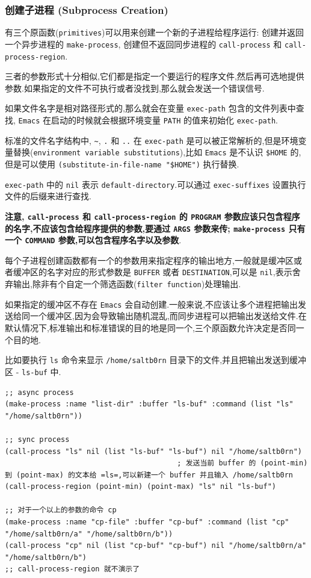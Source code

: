 \documentclass[11pt]{article}
\begin{document}
\subsubsection{创建子进程 (Subprocess Creation)}
\label{sec:org5fa4f65}

有三个原函数(\texttt{primitives})可以用来创建一个新的子进程给程序运行: 创建并返回一个异步进程的 \texttt{make-process}, 创建但不返回同步进程的 \texttt{call-process} 和 \texttt{call-process-region}.

三者的参数形式十分相似,它们都是指定一个要运行的程序文件,然后再可选地提供参数.如果指定的文件不可执行或者没找到,那么就会发送一个错误信号.

如果文件名字是相对路径形式的,那么就会在变量 \texttt{exec-path} 包含的文件列表中查找, \texttt{Emacs} 在启动的时候就会根据环境变量 \texttt{PATH} 的值来初始化 \texttt{exec-path}.

标准的文件名字结构中, \texttt{\textasciitilde{}}, \texttt{.} 和 \texttt{..} 在 \texttt{exec-path} 是可以被正常解析的,但是环境变量替换(\texttt{environment variable substitutions}),比如 \texttt{Emacs} 是不认识 \texttt{\$HOME} 的,但是可以使用 \texttt{(substitute-in-file-name "\$HOME")} 执行替换.

\texttt{exec-path} 中的 \texttt{nil} 表示 \texttt{default-directory}.可以通过 \texttt{exec-suffixes} 设置执行文件的后缀来进行查找.

\textbf{注意, \texttt{call-process} 和 \texttt{call-process-region} 的 \texttt{PROGRAM} 参数应该只包含程序的名字,不应该包含给程序提供的参数,要通过 \texttt{ARGS} 参数来传; \texttt{make-process} 只有一个 \texttt{COMMAND} 参数,可以包含程序名字以及参数}.

每个子进程创建函数都有一个的参数用来指定程序的输出地方,一般就是缓冲区或者缓冲区的名字对应的形式参数是 \texttt{BUFFER} 或者 \texttt{DESTINATION},可以是 \texttt{nil},表示舍弃输出,除非有个自定一个筛选函数(\texttt{filter function})处理输出.

如果指定的缓冲区不存在 \texttt{Emacs} 会自动创建.一般来说,不应该让多个进程把输出发送给同一个缓冲区,因为会导致输出随机混乱,而同步进程可以把输出发送给文件.在默认情况下,标准输出和标准错误的目的地是同一个,三个原函数允许决定是否同一个目的地.

比如要执行 \texttt{ls} 命令来显示 \texttt{/home/saltb0rn} 目录下的文件,并且把输出发送到缓冲区 - \texttt{ls-buf} 中.

\begin{verbatim}
;; async process
(make-process :name "list-dir" :buffer "ls-buf" :command (list "ls" "/home/saltb0rn"))

;; sync process
(call-process "ls" nil (list "ls-buf" "ls-buf") nil "/home/saltb0rn")
                                        ; 发送当前 buffer 的 (point-min) 到 (point-max) 的文本给 =ls=,可以新建一个 buffer 并且输入 /home/saltb0rn
(call-process-region (point-min) (point-max) "ls" nil "ls-buf")

;; 对于一个以上的参数的命令 cp
(make-process :name "cp-file" :buffer "cp-buf" :command (list "cp" "/home/saltb0rn/a" "/home/saltb0rn/b"))
(call-process "cp" nil (list "cp-buf" "cp-buf") nil "/home/saltb0rn/a" "/home/saltb0rn/b")
;; call-process-region 就不演示了
\end{verbatim}
\end{document}
